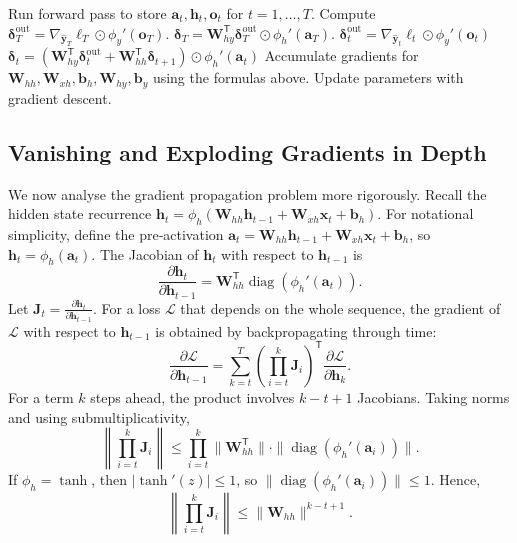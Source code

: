 \documentclass{tufte-handout}
\begin{document}
\begin{algorithm}[h]
    \caption{Backpropagation Through Time (BPTT)}
    \begin{algorithmic}[1]
        \State Run forward pass to store $\mathbf{a}_t, \mathbf{h}_t, \mathbf{o}_t$ for $t=1,\dots,T$.
        \State Compute $\boldsymbol{\delta}_T^{\text{out}} = \nabla_{\hat{\mathbf{y}}_T}\ell_T \odot \phi_y'(\mathbf{o}_T)$.
        \State $\boldsymbol{\delta}_T = \mathbf{W}_{hy}^{\mathsf{T}} \boldsymbol{\delta}_T^{\text{out}} \odot \phi_h'(\mathbf{a}_T)$.
            \State $\boldsymbol{\delta}_t^{\text{out}} = \nabla_{\hat{\mathbf{y}}_t}\ell_t \odot \phi_y'(\mathbf{o}_t)$
            \State $\boldsymbol{\delta}_t = \left( \mathbf{W}_{hy}^{\mathsf{T}} \boldsymbol{\delta}_t^{\text{out}} + \mathbf{W}_{hh}^{\mathsf{T}} \boldsymbol{\delta}_{t+1} \right) \odot \phi_h'(\mathbf{a}_t)$
        \EndFor
        \State Accumulate gradients for $\mathbf{W}_{hh}, \mathbf{W}_{xh}, \mathbf{b}_h, \mathbf{W}_{hy}, \mathbf{b}_y$ using the formulas above.
        \State Update parameters with gradient descent.
    \end{algorithmic}
\end{algorithm}

\subsection{Vanishing and Exploding Gradients in Depth}

We now analyse the gradient propagation problem more rigorously. Recall the hidden state recurrence $\mathbf{h}_t = \phi_h(\mathbf{W}_{hh}\mathbf{h}_{t-1} + \mathbf{W}_{xh}\mathbf{x}_t + \mathbf{b}_h)$. For notational simplicity, define the pre‑activation $\mathbf{a}_t = \mathbf{W}_{hh}\mathbf{h}_{t-1} + \mathbf{W}_{xh}\mathbf{x}_t + \mathbf{b}_h$, so $\mathbf{h}_t = \phi_h(\mathbf{a}_t)$. The Jacobian of $\mathbf{h}_t$ with respect to $\mathbf{h}_{t-1}$ is
\[
\frac{\partial \mathbf{h}_t}{\partial \mathbf{h}_{t-1}} = \mathbf{W}_{hh}^{\mathsf{T}} \operatorname{diag}(\phi_h'(\mathbf{a}_t)).
\]
Let $\mathbf{J}_t = \frac{\partial \mathbf{h}_t}{\partial \mathbf{h}_{t-1}}$. For a loss $\mathcal{L}$ that depends on the whole sequence, the gradient of $\mathcal{L}$ with respect to $\mathbf{h}_{t-1}$ is obtained by backpropagating through time:
\[
\frac{\partial \mathcal{L}}{\partial \mathbf{h}_{t-1}} = \sum_{k=t}^{T} \left( \prod_{i=t}^{k} \mathbf{J}_i \right)^{\mathsf{T}} \frac{\partial \mathcal{L}}{\partial \mathbf{h}_k}.
\]
For a term $k$ steps ahead, the product involves $k-t+1$ Jacobians. Taking norms and using submultiplicativity,
\[
\left\| \prod_{i=t}^{k} \mathbf{J}_i \right\| \le \prod_{i=t}^{k} \| \mathbf{W}_{hh}^{\mathsf{T}} \| \cdot \| \operatorname{diag}(\phi_h'(\mathbf{a}_i)) \|.
\]
If $\phi_h = \tanh$, then $|\tanh'(z)| \le 1$, so $\| \operatorname{diag}(\phi_h'(\mathbf{a}_i)) \| \le 1$. Hence,
\[
\left\| \prod_{i=t}^{k} \mathbf{J}_i \right\| \le \| \mathbf{W}_{hh} \|^{k-t+1}.
\]
\end{document}
